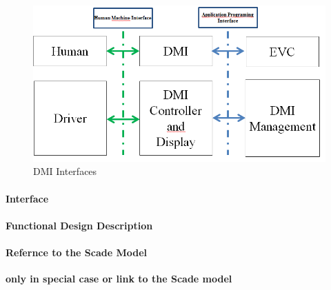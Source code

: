 \begin{figure}[hbtp]
\centering
\includegraphics[scale=0.5]{images/DMI_Interfaces}
\caption{DMI Interfaces}
\end{figure}

\paragraph{Interface}

\paragraph{Functional Design Description}

\paragraph{Refernce to the Scade Model}

\textbf{only in special case or link to the Scade model}

